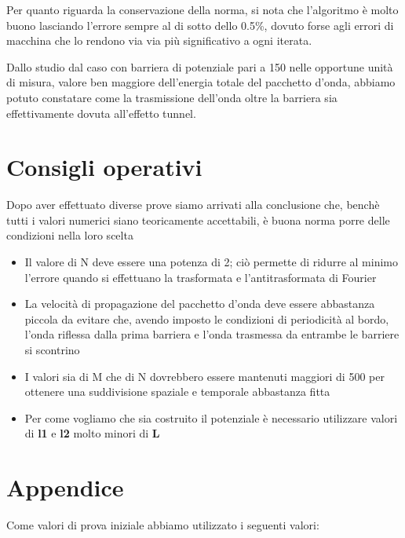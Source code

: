 \documentclass[12pt,onecolumn,a4paper]{memoir}
\begin{document}
Per quanto riguarda la conservazione della norma, si nota che l'algoritmo è molto buono lasciando l'errore sempre al di sotto dello 0.5\%, dovuto forse agli errori di macchina che lo rendono via via più significativo a ogni iterata.\newline

Dallo studio dal caso con barriera di potenziale pari a 150 nelle opportune unità di misura, valore ben maggiore dell'energia totale del pacchetto d'onda, abbiamo potuto constatare come la trasmissione dell'onda oltre la barriera sia effettivamente dovuta all'effetto tunnel.

\section*{Consigli operativi}
Dopo aver effettuato diverse prove siamo arrivati alla conclusione che, benchè tutti i valori numerici siano teoricamente accettabili, è buona norma porre delle condizioni nella loro scelta
\begin{itemize}
\item Il valore di N deve essere una potenza di 2; ciò permette di ridurre al minimo l'errore quando si effettuano la trasformata e l'antitrasformata di Fourier
\item  La velocità di propagazione del pacchetto d'onda deve essere abbastanza piccola da evitare che, avendo imposto le condizioni di periodicità al bordo, l'onda riflessa dalla prima barriera e l'onda trasmessa da entrambe le barriere si scontrino
\item I valori sia di M che di N dovrebbero essere mantenuti maggiori di 500 per ottenere una suddivisione spaziale e temporale abbastanza fitta
\item Per come vogliamo che sia costruito il potenziale è necessario utilizzare valori di \textbf{l1} e \textbf{l2} molto minori di \textbf{L}
\end{itemize}
\section*{Appendice}

Come valori di prova iniziale abbiamo utilizzato i seguenti valori:






%

%
\end{document}
